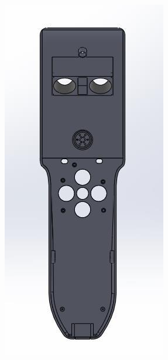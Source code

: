 \begin{figure}[!htbp]
    \centering
    \begin{subfigure}[m]{.3\linewidth}
        \includegraphics[width=\linewidth]{assets/conception1/img333.jpg}

\end{subfigure}
\end{figure}
